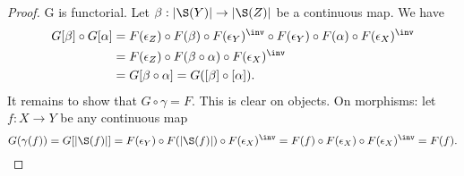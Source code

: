 \begin{proof}
G is functorial. Let $\beta:|\S(Y)|\to|\S(Z)|$ be a continuous map. We have
\begin{align*}
    G[\beta]\circ G[\alpha]&=F(\epsilon_Z)\circ F(\beta)\circ F(\epsilon_Y)^\inv\circ F(\epsilon_Y)\circ F(\alpha)\circ F(\epsilon_X)^\inv\\
    &=F(\epsilon_Z)\circ F(\beta\circ\alpha)\circ F(\epsilon_X)^\inv\\
    &=G[\beta\circ\alpha]=G([\beta]\circ[\alpha]).
\end{align*}
It remains to show that $G\circ\gamma=F$. This is clear on objects. On morphisms: let $f:X\to Y$ be any continuous map
\[G(\gamma(f))=G[|\S(f)|]=F(\epsilon_Y)\circ F(|\S(f)|)\circ F(\epsilon_X)^\inv=F(f)\circ F(\epsilon_X)\circ F(\epsilon_X)^\inv=F(f).\]
\end{proof}
